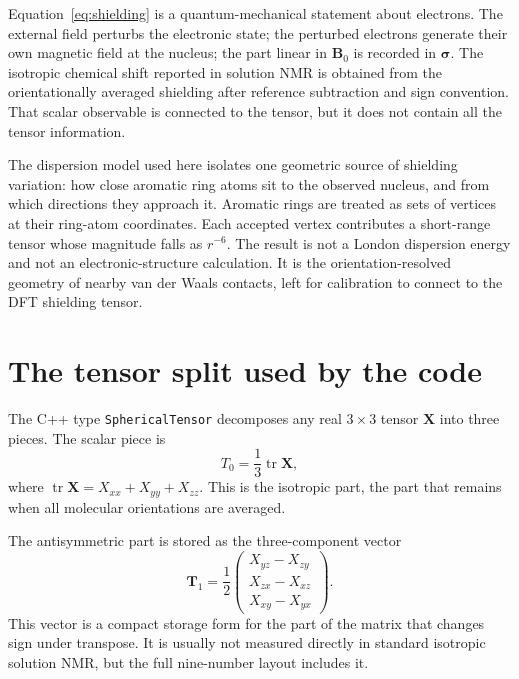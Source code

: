 \documentclass[11pt]{article}
\begin{document}
Equation~\eqref{eq:shielding} is a quantum-mechanical statement about
electrons. The external field perturbs the electronic state; the perturbed
electrons generate their own magnetic field at the nucleus; the part linear in
\(\bm B_0\) is recorded in \(\bm\sigma\). The isotropic chemical shift reported
in solution NMR is obtained from the orientationally averaged shielding after
reference subtraction and sign convention. That scalar observable is connected
to the tensor, but it does not contain all the tensor information.

The dispersion model used here isolates one geometric source of shielding
variation: how close aromatic ring atoms sit to the observed nucleus, and from
which directions they approach it. Aromatic rings are treated as sets of
vertices at their ring-atom coordinates. Each accepted vertex contributes a
short-range tensor whose magnitude falls as \(r^{-6}\). The result is not a
London dispersion energy and not an electronic-structure calculation. It is the
orientation-resolved geometry of nearby van der Waals contacts, left for
calibration to connect to the DFT shielding tensor.

\section{The tensor split used by the code}

The C++ type \texttt{SphericalTensor} decomposes any real \(3\times3\) tensor
\(\bm X\) into three pieces. The scalar piece is
\begin{equation}
  T_0 = \frac{1}{3}\operatorname{tr}\bm X ,
  \label{eq:t0}
\end{equation}
where \(\operatorname{tr}\bm X=X_{xx}+X_{yy}+X_{zz}\). This is the isotropic
part, the part that remains when all molecular orientations are averaged.

The antisymmetric part is stored as the three-component vector
\begin{equation}
  \bm T_1 =
  \frac{1}{2}
  \begin{pmatrix}
    X_{yz}-X_{zy}\\
    X_{zx}-X_{xz}\\
    X_{xy}-X_{yx}
  \end{pmatrix}.
  \label{eq:t1}
\end{equation}
This vector is a compact storage form for the part of the matrix that changes
sign under transpose. It is usually not measured directly in standard isotropic
solution NMR, but the full nine-number layout includes it.
\end{document}
